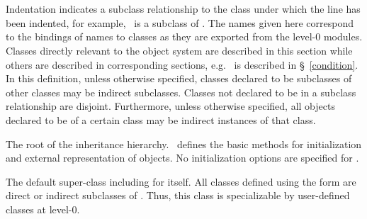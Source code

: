 \begin{optDefinition}
\begin{table}
{\begin{tabbing}
    \>\>\\
    \>\>\>\\
    \>\>\>\\
    \> \\
    \>\>\\
    \>\>\\
    \> \\
    \>\>%
\end{tabbing}%
}%
\end{table}%
%
Indentation indicates a subclass relationship to the class under which the line
has been indented, for example, \ is a subclass of
.  The names given here correspond to the bindings of names to
classes as they are exported from the level-0 modules.  Classes directly
relevant to the object system are described in this section while others are
described in corresponding sections, e.g. \ is described in
\S~\ref{condition}.
%
In this definition, unless otherwise specified, classes declared to be
subclasses of other classes may be indirect subclasses. Classes not declared to
be in a subclass relationship are disjoint.  Furthermore, unless otherwise
specified, all objects declared to be of a certain class may be indirect
instances of that class.

%
The root of the inheritance hierarchy. \ defines the basic
methods for initialization and external representation of objects.  No
initialization options are specified for .

%
The default super-class including for itself.  All classes defined using the
 form are direct or indirect subclasses of
.  Thus, this class is specializable by user-defined classes at
level-0.
%
\end{optDefinition}

